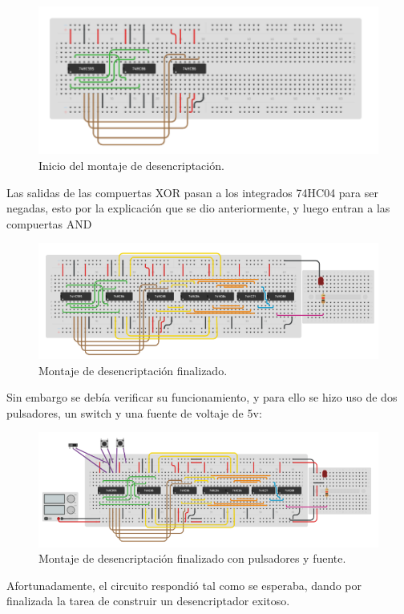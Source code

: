 \documentclass{article}
\begin{document}
\begin{figure}[h]
\includegraphics[scale=0.7]{desencriptacion1.png}
\centering
\caption{Inicio del montaje de desencriptación.}
\label{fig:desencriptación1}
\end{figure}

\newpage
Las salidas de las compuertas XOR pasan a los integrados 74HC04 para ser negadas, esto por la explicación que se dio anteriormente, y luego entran a las compuertas AND
\begin{figure}[h]
\includegraphics[scale=0.7]{desencriptacion2.png}
\centering
\caption{Montaje de desencriptación finalizado.}
\label{fig:desencriptación2}
\end{figure}

\newpage
Sin embargo se debía verificar su funcionamiento, y para ello se hizo uso de dos pulsadores, un switch y una fuente de voltaje de 5v:
\begin{figure}[h]
\includegraphics[scale=0.7]{desencriptacion pulsadores.png}
\centering
\caption{Montaje de desencriptación finalizado con pulsadores y fuente.}
\label{fig:desencriptación3}
\end{figure}
\newline
Afortunadamente, el circuito respondió tal como se esperaba, dando por finalizada la tarea de construir un desencriptador exitoso.
\end{document}
